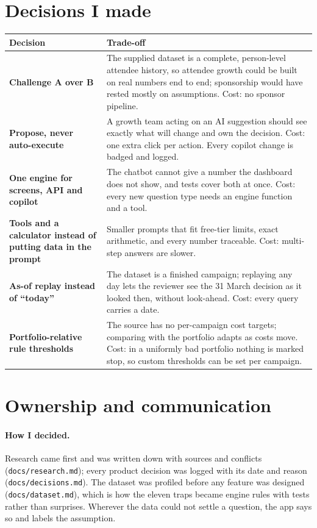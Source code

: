 \documentclass[11pt,a4paper]{article}
\newcommand{\code}[1]{\texttt{#1}}
\begin{document}
\section{Decisions I made}\label{sec:decisions}
\begin{longtable}{@{}p{4.4cm}p{10.8cm}@{}}
\toprule
\textbf{Decision} & \textbf{Trade-off} \\
\midrule
\textbf{Challenge A over B} & The supplied dataset is a complete, person-level attendee history, so attendee growth could be built on real numbers end to end; sponsorship would have rested mostly on assumptions. Cost: no sponsor pipeline. \\
\textbf{Propose, never auto-execute} & A growth team acting on an AI suggestion should see exactly what will change and own the decision. Cost: one extra click per action. Every copilot change is badged and logged. \\
\textbf{One engine for screens, API and copilot} & The chatbot cannot give a number the dashboard does not show, and tests cover both at once. Cost: every new question type needs an engine function and a tool. \\
\textbf{Tools and a calculator instead of putting data in the prompt} & Smaller prompts that fit free-tier limits, exact arithmetic, and every number traceable. Cost: multi-step answers are slower. \\
\textbf{As-of replay instead of ``today''} & The dataset is a finished campaign; replaying any day lets the reviewer see the 31 March decision as it looked then, without look-ahead. Cost: every query carries a date. \\
\textbf{Portfolio-relative rule thresholds} & The source has no per-campaign cost targets; comparing with the portfolio adapts as costs move. Cost: in a uniformly bad portfolio nothing is marked stop, so custom thresholds can be set per campaign. \\
\bottomrule
\end{longtable}

\section{Ownership and communication}\label{sec:ownership}
\paragraph{How I decided.} Research came first and was written down with sources and conflicts (\code{docs/research.md}); every product decision was logged with its date and reason (\code{docs/decisions.md}). The dataset was profiled before any feature was designed (\code{docs/dataset.md}), which is how the eleven traps became engine rules with tests rather than surprises. Wherever the data could not settle a question, the app says so and labels the assumption.
\end{document}
